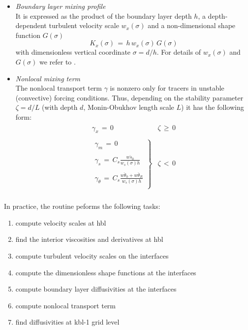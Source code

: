 \begin{itemize}
%
\item
\textit{Boundary layer mixing profile} \\
%
It is expressed as the product of the boundary layer depth $h$,
a depth-dependent turbulent velocity scale $w_x(\sigma)$ and a
non-dimensional shape function $G(\sigma)$
%
\begin{equation}
K_x(\sigma) \, = \, h \, w_x(\sigma) \, G(\sigma)
\end{equation}
%
with dimensionless vertical coordinate $\sigma = d/h$.
For details of $ w_x(\sigma)$ and $G(\sigma)$ we refer to
\cite{lar-eta:94}.

%
\item
\textit{Nonlocal mixing term} \\
%
The nonlocal transport term $\gamma$ is nonzero only for
tracers in unstable (convective) forcing conditions.
Thus, depending on the  stability parameter $\zeta = d/L$ 
(with depth $d$, Monin-Obukhov length scale $L$)
it has the following form:
%
\begin{eqnarray}
\begin{array}{cl}
\gamma_x \, = \, 0 & \zeta \, \ge \, 0 \\
~ & ~ \\
\left.
\begin{array}{c}
\gamma_m \, = \, 0 \\
 ~ \\
\gamma_s \, = \, C_s 
\frac{\overline{w s_0}}{w_s(\sigma) h} \\
 ~ \\
\gamma_{\theta} \, = \, C_s
\frac{\overline{w \theta_0}+\overline{w \theta_R}}{w_s(\sigma) h} \\
\end{array}
\right\} 
&
\zeta \, < \, 0 \\
\end{array}
\end{eqnarray}

\end{itemize}

In practice, the routine peforms the following tasks:
%
\begin{enumerate}
%
\item
compute velocity scales at hbl
%
\item
find the interior viscosities and derivatives at hbl
%
\item
compute turbulent velocity scales on the interfaces
%
\item
compute the dimensionless shape functions at the interfaces
%
\item
compute boundary layer diffusivities at the interfaces
%
\item
compute nonlocal transport term
%
\item
find diffusivities at kbl-1 grid level
%
\end{enumerate}

